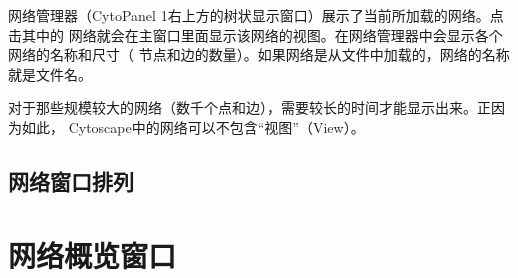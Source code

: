     网络管理器（CytoPanel 1右上方的树状显示窗口）展示了当前所加载的网络。点击其中的
    网络就会在主窗口里面显示该网络的视图。在网络管理器中会显示各个网络的名称和尺寸（
    节点和边的数量）。如果网络是从文件中加载的，网络的名称就是文件名。

    对于那些规模较大的网络（数千个点和边），需要较长的时间才能显示出来。正因为如此，
    Cytoscape中的网络可以不包含“视图”（View）。
    \subsection{网络窗口排列}


\section{网络概览窗口}
	




